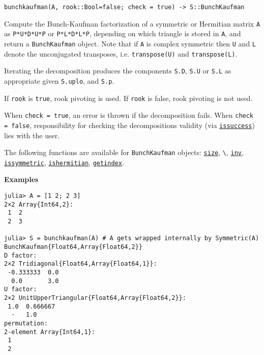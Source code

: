\begin{adjustwidth}{2em}{0pt}


\begin{verbatim}
bunchkaufman(A, rook::Bool=false; check = true) -> S::BunchKaufman
\end{verbatim}

Compute the Bunch-Kaufman \footnotemark[3] factorization of a symmetric or Hermitian matrix \texttt{A} as \texttt{P{\textquotesingle}*U*D*U{\textquotesingle}*P} or \texttt{P{\textquotesingle}*L*D*L{\textquotesingle}*P}, depending on which triangle is stored in \texttt{A}, and return a \texttt{BunchKaufman} object. Note that if \texttt{A} is complex symmetric then \texttt{U{\textquotesingle}} and \texttt{L{\textquotesingle}} denote the unconjugated transposes, i.e. \texttt{transpose(U)} and \texttt{transpose(L)}.

Iterating the decomposition produces the components \texttt{S.D}, \texttt{S.U} or \texttt{S.L} as appropriate given \texttt{S.uplo}, and \texttt{S.p}.

If \texttt{rook} is \texttt{true}, rook pivoting is used. If \texttt{rook} is false, rook pivoting is not used.

When \texttt{check = true}, an error is thrown if the decomposition fails. When \texttt{check = false}, responsibility for checking the decomposition{\textquotesingle}s validity (via \hyperlink{10694198281534172656}{\texttt{issuccess}}) lies with the user.

The following functions are available for \texttt{BunchKaufman} objects: \hyperlink{17888996102305087038}{\texttt{size}}, \texttt{{\textbackslash}}, \hyperlink{13336866048543706848}{\texttt{inv}}, \hyperlink{2326080217547608316}{\texttt{issymmetric}}, \hyperlink{2319981190929881860}{\texttt{ishermitian}}, \hyperlink{13720608614876840481}{\texttt{getindex}}.

\textbf{Examples}


\begin{verbatim}
julia> A = [1 2; 2 3]
2×2 Array{Int64,2}:
 1  2
 2  3

julia> S = bunchkaufman(A) # A gets wrapped internally by Symmetric(A)
BunchKaufman{Float64,Array{Float64,2}}
D factor:
2×2 Tridiagonal{Float64,Array{Float64,1}}:
 -0.333333  0.0
  0.0       3.0
U factor:
2×2 UnitUpperTriangular{Float64,Array{Float64,2}}:
 1.0  0.666667
  ⋅   1.0
permutation:
2-element Array{Int64,1}:
 1
 2


\end{verbatim}
\end{adjustwidth}
